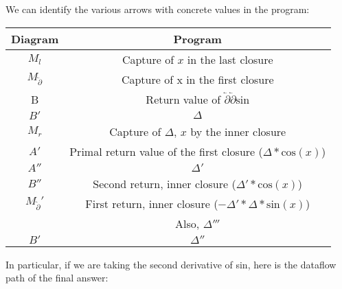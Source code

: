 \documentclass[letterpaper, 10 pt, conference]{ieeeconf}  %
\begin{document}
We can identify the various arrows with concrete values in the program:

\begin{center}
\begin{tabular}{c|c}
Diagram & Program \\ \hline
$M_l$ & Capture of $x$ in the last closure \\
$ M_{\overleftarrow{\partial}} $ & Capture of x in the first closure \\
B & Return value of $\overleftarrow{\partial} \overleftarrow{\partial} \text{sin}$ \\
$B'$ & $\Delta$ \\
$M_r$ & Capture of $\Delta$, $x$ by the inner closure \\
$A'$ & Primal return value of the first closure ($\Delta * \text{cos}(x)$) \\
$A''$ & $\Delta'$ \\
$B''$ & Second return, inner closure ($\Delta' * \text{cos}(x)$) \\
$M_{\overleftarrow{\partial}}'$ & First return, inner closure ($- \Delta' * \Delta * \text{sin}(x)$) \\
& Also, $\Delta'''$ \\
$B'$ & $\Delta''$
\end{tabular}
\end{center}

In particular, if we are taking the second derivative of sin, here is the
dataflow path of the final answer:
\end{document}
